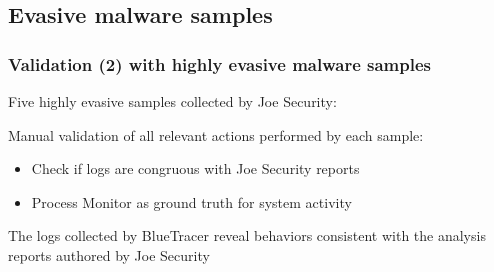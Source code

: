 \documentclass[compress]{beamer}
\begin{document}
\subsection{Evasive malware samples}
\begin{frame}
    \frametitle{Validation (2) with highly evasive malware samples}
    
	Five highly evasive samples collected by Joe Security:    
    
    \begin{table}[h]
\vspace*{-0.1cm}
\begin{center}
\end{center}
\end{table}
\vspace{-0.1cm}
Manual validation of all relevant actions performed by each sample:
\vspace{-0.5cm}
\begin{itemize}
\item Check if logs are congruous with Joe Security reports
\item Process Monitor as ground truth for system activity
\end{itemize}
\medskip
\begin{beamerboxesrounded}[shadow=true]{}
The
logs collected by BlueTracer reveal behaviors consistent with the analysis reports
authored by Joe Security
\end{beamerboxesrounded}	

\end{frame}
\end{document}
